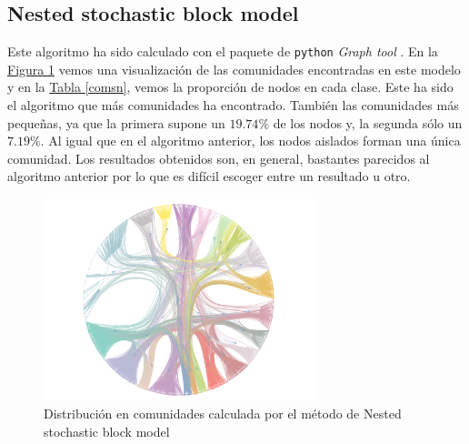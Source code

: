 \documentclass[10pt,a4paper,spanish]{article}
\numberwithin{equation}{section} %
\numberwithin{figure}{section} %
\numberwithin{table}{section} %
\begin{document}
\subsection{Nested stochastic block model}
Este algoritmo ha sido calculado con el paquete de \texttt{python} \textit{Graph tool} \cite{peixoto_graph-tool_2014}. En la \hyperref[nested]{Figura \ref*{nested}} vemos una visualización de las comunidades encontradas en este modelo y en la \hyperref[comsb]{Tabla \ref*{comsn}}, vemos la proporción de nodos en cada clase. Este ha sido el algoritmo que más comunidades ha encontrado. También las comunidades más pequeñas, ya que la primera supone un $19.74\%$ de los nodos y, la segunda sólo un $7.19\%$. Al igual que en el algoritmo anterior, los nodos aislados forman una única comunidad. Los resultados obtenidos son, en general, bastantes parecidos al algoritmo anterior por lo que es difícil escoger entre un resultado u otro.

\begin{figure}[!h]
    \centering
    \includegraphics[width=0.7\textwidth]{nested}
    \caption{Distribución en comunidades calculada por el método de Nested stochastic block model}
    \label{nested}
\end{figure}
\end{document}

